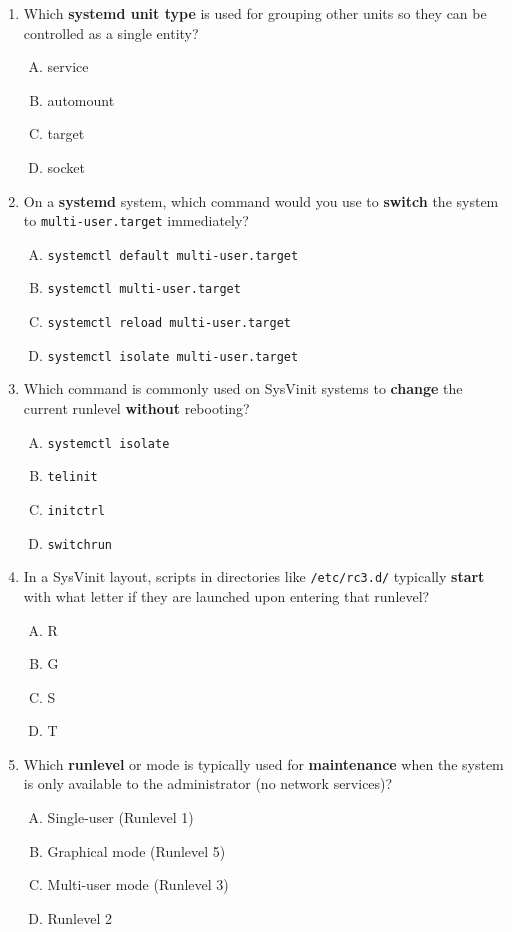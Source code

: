 \documentclass[a4paper]{report}
\begin{document}
\begin{enumerate}[1.]
    \item Which \textbf{systemd unit type} is used for grouping other units so they can be controlled as a single entity?
    \begin{enumerate}[A)]
        \item service
        \item automount
        \item target
        \item socket
    \end{enumerate}
    
    \item On a \textbf{systemd} system, which command would you use to \textbf{switch} the system to \texttt{multi-user.target} immediately?
    \begin{enumerate}[A)]
        \item \texttt{systemctl default multi-user.target}
        \item \texttt{systemctl multi-user.target}
        \item \texttt{systemctl reload multi-user.target}
        \item \texttt{systemctl isolate multi-user.target}
    \end{enumerate}
    
    \item Which command is commonly used on SysVinit systems to \textbf{change} the current runlevel \textbf{without} rebooting?
    \begin{enumerate}[A)]
        \item \texttt{systemctl isolate}
        \item \texttt{telinit}
        \item \texttt{initctrl}
        \item \texttt{switchrun}
    \end{enumerate}
    
    \item In a SysVinit layout, scripts in directories like \texttt{/etc/rc3.d/} typically \textbf{start} with what letter if they are launched upon entering that runlevel?
    \begin{enumerate}[A)]
        \item R
        \item G
        \item S
        \item T
    \end{enumerate}
    
    \item Which \textbf{runlevel} or mode is typically used for \textbf{maintenance} when the system is only available to the administrator (no network services)?
    \begin{enumerate}[A)]
        \item Single-user (Runlevel 1)
        \item Graphical mode (Runlevel 5)
        \item Multi-user mode (Runlevel 3)
        \item Runlevel 2
    \end{enumerate}


\end{enumerate}
\end{document}
